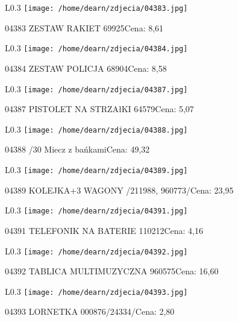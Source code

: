 \begin{wrapfigure}{L}{0.3\textwidth}
\texttt{[image: /home/dearn/zdjecia/04383.jpg]}
\end{wrapfigure}
04383 ZESTAW RAKIET                                   69925Cena: 8,61\newline
\begin{wrapfigure}{L}{0.3\textwidth}
\texttt{[image: /home/dearn/zdjecia/04384.jpg]}
\end{wrapfigure}
04384 ZESTAW POLICJA                                   68904Cena: 8,58\newline
\begin{wrapfigure}{L}{0.3\textwidth}
\texttt{[image: /home/dearn/zdjecia/04387.jpg]}
\end{wrapfigure}
04387 PISTOLET NA STRZAłKI                             64579Cena: 5,07\newline
\begin{wrapfigure}{L}{0.3\textwidth}
\texttt{[image: /home/dearn/zdjecia/04388.jpg]}
\end{wrapfigure}
04388 /30 Miecz z bańkamiCena: 49,32\newline
\begin{wrapfigure}{L}{0.3\textwidth}
\texttt{[image: /home/dearn/zdjecia/04389.jpg]}
\end{wrapfigure}
04389 KOLEJKA+3 WAGONY  /211988, 960773/Cena: 23,95\newline
\begin{wrapfigure}{L}{0.3\textwidth}
\texttt{[image: /home/dearn/zdjecia/04391.jpg]}
\end{wrapfigure}
04391 TELEFONIK NA BATERIE                            110212Cena: 4,16\newline
\begin{wrapfigure}{L}{0.3\textwidth}
\texttt{[image: /home/dearn/zdjecia/04392.jpg]}
\end{wrapfigure}
04392 TABLICA MULTIMUZYCZNA                           960575Cena: 16,60\newline
\begin{wrapfigure}{L}{0.3\textwidth}
\texttt{[image: /home/dearn/zdjecia/04393.jpg]}
\end{wrapfigure}
04393 LORNETKA 000876/24334/Cena: 2,80\newline
